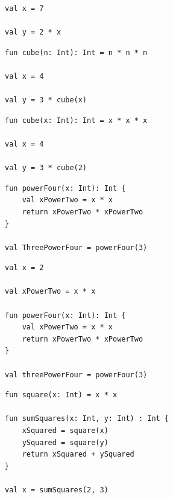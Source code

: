 \documentclass[DIV = 11]{scrartcl}
\begin{document}
\begin{teilaufgaben}
\teilaufgabe \begin{verbatim}
val x = 7

val y = 2 * x
\end{verbatim}



\teilaufgabe \begin{verbatim}
fun cube(n: Int): Int = n * n * n

val x = 4

val y = 3 * cube(x)
\end{verbatim}

\teilaufgabe \begin{verbatim}
fun cube(x: Int): Int = x * x * x

val x = 4

val y = 3 * cube(2)
\end{verbatim}

\teilaufgabe \begin{verbatim}
fun powerFour(x: Int): Int {
    val xPowerTwo = x * x
    return xPowerTwo * xPowerTwo
}

val ThreePowerFour = powerFour(3)
\end{verbatim}
\teilaufgabe \begin{verbatim}
val x = 2

val xPowerTwo = x * x

fun powerFour(x: Int): Int {
    val xPowerTwo = x * x
    return xPowerTwo * xPowerTwo
}

val threePowerFour = powerFour(3)
\end{verbatim}

\teilaufgabe \begin{verbatim}
fun square(x: Int) = x * x

fun sumSquares(x: Int, y: Int) : Int {
    xSquared = square(x)
    ySquared = square(y)
    return xSquared + ySquared
}

val x = sumSquares(2, 3)
\end{verbatim}




\end{teilaufgaben}
\end{document}

